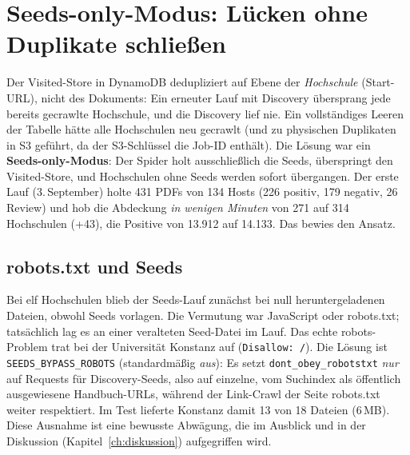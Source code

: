 \section{Seeds-only-Modus: Lücken ohne Duplikate schließen}
Der Visited-Store in DynamoDB dedupliziert auf Ebene der \emph{Hochschule} (Start-URL), nicht des Dokuments: Ein erneuter Lauf mit Discovery übersprang jede bereits gecrawlte Hochschule, und die Discovery lief nie. Ein vollständiges Leeren der Tabelle hätte alle Hochschulen neu gecrawlt (und zu physischen Duplikaten in S3 geführt, da der S3-Schlüssel die Job-ID enthält). Die Lösung war ein \textbf{Seeds-only-Modus}: Der Spider holt ausschließlich die Seeds, überspringt den Visited-Store, und Hochschulen ohne Seeds werden sofort übergangen. Der erste Lauf (3.\,September) holte 431 PDFs von 134 Hosts (226 positiv, 179 negativ, 26 Review) und hob die Abdeckung \emph{in wenigen Minuten} von 271 auf 314 Hochschulen (+43), die Positive von 13.912 auf 14.133. Das bewies den Ansatz.

\subsection{robots.txt und Seeds}\label{sec:crawler-robots}
Bei elf Hochschulen blieb der Seeds-Lauf zunächst bei null heruntergeladenen Dateien, obwohl Seeds vorlagen. Die Vermutung war JavaScript oder robots.txt; tatsächlich lag es an einer veralteten Seed-Datei im Lauf. Das echte robots-Problem trat bei der Universität Konstanz auf (\texttt{Disallow: /}). Die Lösung ist \texttt{SEEDS\_BYPASS\_ROBOTS} (standardmäßig \emph{aus}): Es setzt \texttt{dont\_obey\_robotstxt} \emph{nur} auf Requests für Discovery-Seeds, also auf einzelne, vom Suchindex als öffentlich ausgewiesene Handbuch-URLs, während der Link-Crawl der Seite robots.txt weiter respektiert. Im Test lieferte Konstanz damit 13 von 18 Dateien (6\,MB). Diese Ausnahme ist eine bewusste Abwägung, die im Ausblick und in der Diskussion (Kapitel~\ref{ch:diskussion}) aufgegriffen wird.

